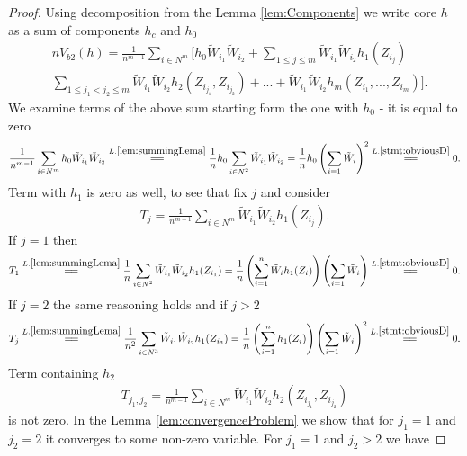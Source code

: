 \begin{proof}
Using decomposition from the Lemma \ref{lem:Components} we write core  $h$ as a sum of components $h_c$ and $h_0$  
\begin{align}
\label{eq:bootstrapedOne}
 &n V_{b2}(h) = \frac{1} {n^{m-1}}  \sum_{i \in N^m}  \Big[h_0  \tilde W_{i_1} \tilde W_{i_2} + \sum_{1 \leq j \leq m } \tilde W_{i_1} \tilde W_{i_2} h_1(Z_{i_j})    \\ 
 &\sum_{1 \leq j_1 < j_2 \leq m } \tilde W_{i_1} \tilde W_{i_2} h_2(Z_{i_{j_1}},Z_{i_{j_2}}) + ... +  \tilde W_{i_1} \tilde W_{i_2}   h_m(Z_{i_1},...,Z_{i_m}) \Big].
\end{align}
We examine terms of the above sum starting form the one with $h_0$ - it is equal to zero
\begin{align}
\frac{1} {n^{m-1}}  \sum_{i \in N^m}  h_0  \tilde W_{i_1} \tilde W_{i_2}   \overset{L.\ref{lem:summingLema}}{=\joinrel=} \frac 1 n h_0 \sum_{i \in N^2} \tilde W_{i_1} \tilde W_{i_2} = \frac 1 n h_0 \left( \sum_{i=1} \tilde W_i \right)^2  \overset{L.\ref{stmt:obviousD}}{=\joinrel=} 0.
\end{align}  
Term with $h_1$ is zero as well, to see that fix $j$ and consider 
\begin{align}
T_{j} = \frac{1} {n^{m-1}}  \sum_{i \in N^m}  \tilde W_{i_1} \tilde W_{i_2} h_1(Z_{i_j}).  
\end{align}  
If $j=1$ then
\begin{align}
T_{1} \overset{L.\ref{lem:summingLema}}{=\joinrel=} \frac{1} {n}  \sum_{i \in N^2}  \tilde W_{i_1} \tilde W_{i_2} h_1(Z_{i_1}) =  \frac{1} {n}  \left( \sum_{i=1}^n  \tilde W_i h_1(Z_i) \right) \left( \sum_{i=1} \tilde W_i \right) \overset{L.\ref{stmt:obviousD}}{=\joinrel=} 0.
\end{align}
If $j=2$ the same reasoning holds and if $j>2$
\begin{align}
T_{j} \overset{L.\ref{lem:summingLema}}{=\joinrel=} \frac{1} {n^2}  \sum_{i \in N^3}  \tilde W_{i_1} \tilde W_{i_2} h_1(Z_{i_3}) =  \frac{1} {n}  \left( \sum_{i=1}^n h_1(Z_i) \right) \left( \sum_{i=1} \tilde W_i \right)^2 \overset{L.\ref{stmt:obviousD}}{=\joinrel=} 0.
\end{align}
Term containing $h_2$ 
\begin{align}
T_{j_1,j_2} = \frac{1} {n^{m-1}}  \sum_{i \in N^m}  \tilde W_{i_1} \tilde W_{i_2} h_2(Z_{i_{j_1}},Z_{i_{j_2}})
\end{align}
is not zero. In the Lemma \ref{lem:convergenceProblem}  we show that for $j_1=1$ and $j_2=2$ it  converges to some non-zero variable. For $j_1 = 1$ and $j_2 > 2$ we have

\end{proof}
